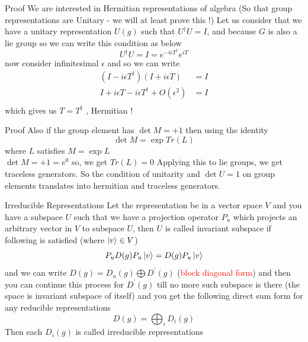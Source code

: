 \documentclass{beamer}
\begin{document}
\begin{frame}{Proof}
We are interested in Hermitian representations of algebra (So that group representations are Unitary - we will at least prove this !)
Let us consider that we have a unitary representation $U(g)$ such that $U^{\dagger}U = I$, and because $G$ is also a lie group so we can write this condition as below
\begin{equation}
    U^{\dagger}U = I = e^{-i\epsilon T^{\dagger}}e^{iT}
\end{equation} now consider infinitesimal $\epsilon$ and so we can write
\begin{align}
    (I - i\epsilon T^{\dagger})(I + i\epsilon T) &= I \\
             I + i\epsilon T - i\epsilon T^{\dagger} + O(\epsilon^{2}) &= I \\
\end{align} which gives us $T = T^{\dagger}$ , Hermitian !
\end{frame} 
\begin{frame}{Proof}
    Also if the group element has $\det M = +1$ then using the identity
    \begin{equation}
        \det M = \exp{Tr(L)}
    \end{equation} where $L$ satisfies $M = \exp{L}$ \\
    \vspace{5mm}
    $\det M = +1 = e^{0}$ so, we get $Tr(L) = 0$
\vspace{5mm}
Applying this to lie groups, we get traceless generators.
So the condition of unitarity and $\det U = 1$ on group elements translates into hermitian and traceless generators.
\end{frame}
\begin{frame}{Irreducible Representations}
    Let the representation be in a vector space $V$ and you have a subspace $U$ such that we have a projection operator $P_{u}$ which projects an arbitrary vector in $V$ to subspace $U$, then $U$ is called invariant subspace if following is satisfied (where $\ket{v}\in V$)
    \vspace{5mm}
    \begin{equation}
        P_{u}D(g)P_{u}\ket{v} = D(g)P_{u}\ket{v}
    \end{equation} 
    \vspace{5mm}
    and we can write $D(g) = D_{u}(g)\bigoplus D^{\prime}(g)$ (\textcolor{red}{block diagonal form}) and then you can continue this process for $D^{\prime}(g)$ till no more such subspace is there (the space is invariant subspace of itself) and you get the following direct sum form for any reducible representations
    \begin{equation}
        D(g) = \bigoplus _{i} D_{i}(g)
    \end{equation}Then each $D_{i}(g)$ is called irreducible representations
\end{frame}
\end{document}
